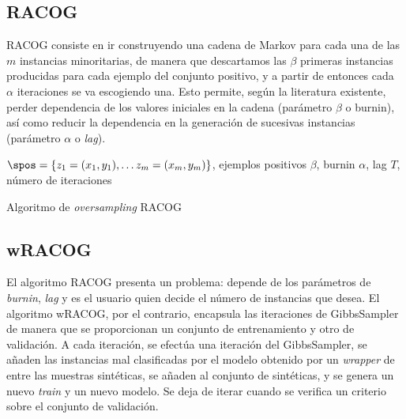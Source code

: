 
\subsection{RACOG}

RACOG consiste en ir construyendo una cadena de Markov para cada una de las $m$ instancias minoritarias, de
manera que descartamos las $\beta$ primeras instancias producidas para cada ejemplo del conjunto positivo, 
y a partir de entonces cada $\alpha$ iteraciones se va escogiendo una. Esto permite, según la literatura 
existente, perder dependencia de los valores iniciales en la cadena (parámetro $\beta$ o burnin), así como 
reducir la dependencia en la generación de sucesivas instancias (parámetro $\alpha$ o \textit{lag}).

\begin{algorithm}[H]
\begin{algorithmic}[1]
  \REQUIRE $\spos = \{z_1=(x_1, y_1), \ldots z_m=(x_m, y_m)\}$, ejemplos positivos
  \REQUIRE $\beta$, burnin
  \REQUIRE $\alpha$, lag
  \REQUIRE $T$, número de iteraciones
  \NEWLINE
    \NEWLINE
    \ENDIF
  \ENDFOR
  \NEWLINE
\end{algorithmic}
\caption{Algoritmo de \textit{oversampling} RACOG}
\label{alg:racog}
\end{algorithm}

\subsection{wRACOG}
El algoritmo RACOG presenta un problema: depende de los parámetros de \textit{burnin}, \textit{lag} y
es el usuario quien decide el número de instancias que desea. El algoritmo wRACOG, por el contrario,
encapsula las iteraciones de GibbsSampler de manera que se proporcionan un conjunto de entrenamiento y otro
de validación. A cada iteración, se efectúa una iteración del GibbsSampler, se añaden las instancias mal 
clasificadas por el modelo obtenido por un \textit{wrapper} de entre las muestras sintéticas, se añaden 
al conjunto de sintéticas, y se genera un nuevo \textit{train} y un nuevo modelo. Se deja de iterar cuando 
se verifica un criterio sobre el conjunto de validación.

